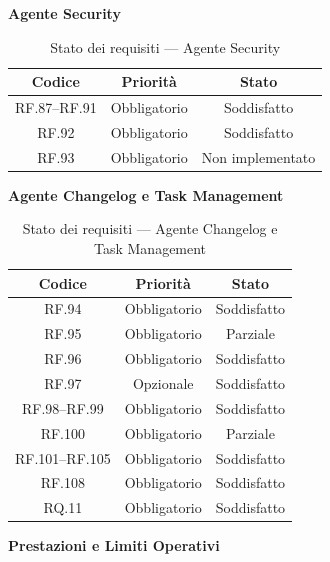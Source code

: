 \documentclass[12pt, a4paper]{article}
\begin{document}
\medskip
\noindent\textbf{Agente Security}
\medskip

\begin{table}[H]
    \centering
    \renewcommand{\arraystretch}{1.3}
    \begin{tabular}{|c|c|c|}
        \hline
        \textbf{Codice} & \textbf{Priorità} & \textbf{Stato} \\ \hline
        RF.87--RF.91 & Obbligatorio & Soddisfatto \\ \hline
        RF.92 & Obbligatorio & Soddisfatto \\ \hline
        RF.93 & Obbligatorio & Non implementato \\ \hline
    \end{tabular}
    \caption{Stato dei requisiti — Agente Security}
    \label{tab:req-security}
\end{table}

\medskip
\noindent\textbf{Agente Changelog e Task Management}
\medskip

\begin{table}[H]
    \centering
    \renewcommand{\arraystretch}{1.3}
    \begin{tabular}{|c|c|c|}
        \hline
        \textbf{Codice} & \textbf{Priorità} & \textbf{Stato} \\ \hline
        RF.94 & Obbligatorio & Soddisfatto \\ \hline
        RF.95 & Obbligatorio & Parziale \\ \hline
        RF.96 & Obbligatorio & Soddisfatto \\ \hline
        RF.97 & Opzionale & Soddisfatto \\ \hline
        RF.98--RF.99 & Obbligatorio & Soddisfatto \\ \hline
        RF.100 & Obbligatorio & Parziale \\ \hline
        RF.101--RF.105 & Obbligatorio & Soddisfatto \\ \hline
        RF.108 & Obbligatorio & Soddisfatto \\ \hline
        RQ.11 & Obbligatorio & Soddisfatto \\ \hline
    \end{tabular}
    \caption{Stato dei requisiti — Agente Changelog e Task Management}
    \label{tab:req-changelog}
\end{table}

\medskip
\noindent\textbf{Prestazioni e Limiti Operativi}
\medskip
\end{document}
